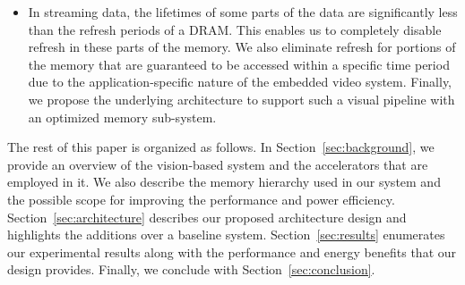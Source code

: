 \begin{itemize}[leftmargin=*]
\item In streaming data, the lifetimes of some parts of the data are significantly less than the refresh periods of a DRAM. This enables us to completely disable refresh in these parts of the memory. 
We also eliminate refresh for portions of the memory that are guaranteed to be accessed within a specific time period due to the application-specific nature of the embedded video system.
Finally, we propose the underlying architecture to support such a visual pipeline with an optimized memory sub-system.
\end{itemize}

The rest of this paper is organized as follows.
In Section~\ref{sec:background}, we provide an overview of the vision-based system and the accelerators that are employed in it. We also describe the memory hierarchy used in our system and the possible scope for improving the performance and power efficiency.
Section~\ref{sec:architecture} describes our proposed architecture design and highlights the additions over a baseline system.
Section~\ref{sec:results} enumerates our experimental results along with the performance and energy benefits that our design provides. Finally, we conclude with Section~\ref{sec:conclusion}.


